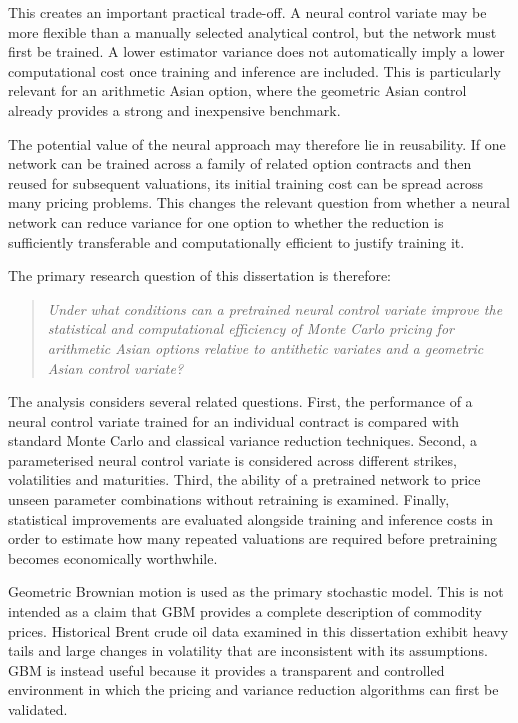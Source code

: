 \documentclass[12pt,a4paper]{report}
\begin{document}
This creates an important practical trade-off. A neural control variate may be more flexible than a manually selected analytical control, but the network must first be trained. A lower estimator variance does not automatically imply a lower computational cost once training and inference are included. This is particularly relevant for an arithmetic Asian option, where the geometric Asian control already provides a strong and inexpensive benchmark.

The potential value of the neural approach may therefore lie in reusability. If one network can be trained across a family of related option contracts and then reused for subsequent valuations, its initial training cost can be spread across many pricing problems. This changes the relevant question from whether a neural network can reduce variance for one option to whether the reduction is sufficiently transferable and computationally efficient to justify training it.

The primary research question of this dissertation is therefore:

\begin{quote}
\textit{Under what conditions can a pretrained neural control variate improve the statistical and computational efficiency of Monte Carlo pricing for arithmetic Asian options relative to antithetic variates and a geometric Asian control variate?}
\end{quote}

The analysis considers several related questions. First, the performance of a neural control variate trained for an individual contract is compared with standard Monte Carlo and classical variance reduction techniques. Second, a parameterised neural control variate is considered across different strikes, volatilities and maturities. Third, the ability of a pretrained network to price unseen parameter combinations without retraining is examined. Finally, statistical improvements are evaluated alongside training and inference costs in order to estimate how many repeated valuations are required before pretraining becomes economically worthwhile.

Geometric Brownian motion is used as the primary stochastic model. This is not intended as a claim that GBM provides a complete description of commodity prices. Historical Brent crude oil data examined in this dissertation exhibit heavy tails and large changes in volatility that are inconsistent with its assumptions. GBM is instead useful because it provides a transparent and controlled environment in which the pricing and variance reduction algorithms can first be validated.
\end{document}
